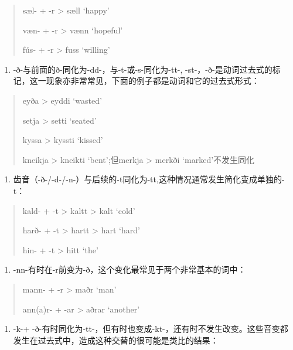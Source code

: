 \begin{quote}
  sæl- + -r > sæll `happy'

  væn- + -r > vænn `hopeful'

  fús- + -r > fuss `willing'
\end{quote}

\begin{enumerate}
  \def\labelenumi{(\alph{enumi})}
  \setcounter{enumi}{1}
  \item
        -ð-与前面的ð-同化为-dd-，与-t-或-s-同化为-tt-,
        -st-，-ð-是动词过去式的标记，这一现象亦非常常见，下面的例子都是动词和它的过去式形式：
\end{enumerate}

\begin{quote}
  eyða > eyddi `wasted'

  setja > setti `seated'

  kyssa > kyssti `kissed'

  kneikja > kneikti `bent';但merkja > merkði
  `marked'不发生同化
\end{quote}

\begin{enumerate}
  \def\labelenumi{(\alph{enumi})}
  \setcounter{enumi}{2}
  \item
        齿音（-ð-/-d-/-n-）与后续的-t同化为-tt,这种情况通常发生简化变成单独的-t：
\end{enumerate}

\begin{quote}
  kald- + -t > kaltt > kalt `cold'

  harð- + -t > hartt > hart `hard'

  hin- + -t > hitt `the'
\end{quote}

\begin{enumerate}
  \def\labelenumi{(\alph{enumi})}
  \setcounter{enumi}{3}
  \item
        -nn-有时在-r前变为-ð，这个变化最常见于两个非常基本的词中：
\end{enumerate}

\begin{quote}
  mann- + -r > maðr `man'

  ann(a)r- + -ar > aðrar `another'
\end{quote}

\begin{enumerate}
  \def\labelenumi{(\alph{enumi})}
  \setcounter{enumi}{4}
  \item
        -k-+
        -ð-有时同化为-tt-，但有时也变成-kt-，还有时不发生改变。这些音变都发生在过去式中，造成这种交替的很可能是类比的结果：
\end{enumerate}


